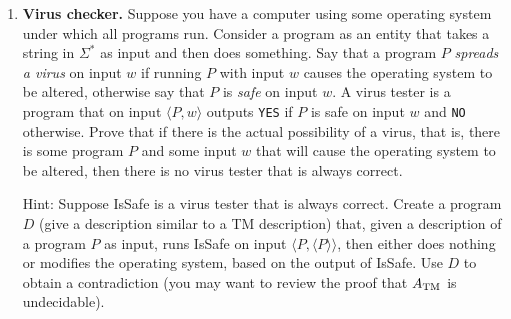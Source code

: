 \documentclass[11pt]{article}
\begin{document}
\assignmentnametitlestuff


\begin{enumerate}



\item {\bf Virus checker.} Suppose you have a computer using some operating system under which all programs run.
Consider a program as an entity that takes a string in $\Sigma^*$ as input and then does
something. Say that a program $P$ {\em spreads a virus} on input $w$ if running $P$ with input
$w$ causes the operating system to be altered, otherwise say that $P$ is {\em safe} on input $w$.
A virus tester is a program that on input $\langle P, w\rangle$ outputs {\tt YES} if $P$ is safe on input $w$
and {\tt NO} otherwise. Prove that if there is the actual possibility of a virus, that is, there
is some program $P$ and some input $w$ that will cause the operating system to be altered,
then there is no virus tester that is always correct.

Hint: Suppose IsSafe is a virus tester that is always correct. Create a program $D$ (give
a description similar to a TM description) that, given a description of a program $P$ as
input, runs IsSafe on input $\langle P, \langle P \rangle \rangle$, then either does nothing 
or modifies the operating system, based on the output of IsSafe. Use $D$ to obtain a
contradiction (you may want to review the proof that $A_\textnormal{TM}$ is undecidable).



\end{enumerate}
\end{document}
